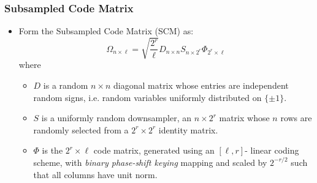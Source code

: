 \documentclass[9pt]{beamer}
\begin{document}
\begin{frame}
\frametitle{Subsampled Code Matrix} 
\begin{itemize} 
   \item Form the Subsampled Code Matrix (SCM) as:
\[ \Omega_{n \times \ell} = \sqrt{ \frac{2^r}{\ell}} D_{n \times n} S_{n \times 2^r} \Phi_{2^r \times \ell} \]
where

\begin{itemize}
\item $D$ is a random $n \times n$ diagonal matrix whose entries are independent random signs, i.e. random variables uniformly distributed on $\{ \pm 1 \}$.
\vspace{3mm}

\item $S$ is a uniformly random downsampler, an $n \times 2^r$ matrix whose $n$ rows are randomly selected from a $2^r \times 2^r$ identity matrix.
\vspace{3mm}

\item $\Phi$ is the $2^r \times \ell$ code matrix, generated using an $[ \ell, r ]$- linear coding scheme, with \textit{binary phase-shift keying} mapping and scaled by $2^{-r/2}$ such that all columns have unit norm.
\end{itemize}

\end{itemize}
\end{frame}
\end{document}
